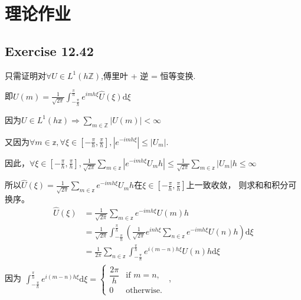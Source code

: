 \documentclass[UTF8]{ctexart}
\newcommand{\dif}{\mathrm{d}}
\begin{document}
\pagestyle{fancy}
\fancyhead{}
\rhead{\today}



\section*{理论作业}
\subsection*{Exercise 12.42}
只需证明对$\forall U \in L^1(h\mathbb{Z} )$,傅里叶 + 逆 = 恒等变换.

即$U(m) = \frac{1}{\sqrt{2\pi}} \int_{-\frac{\pi}{h}}^{\frac{\pi}{h}} e^{imh\xi}\hat{U}(\xi) \dif\xi$

因为$U\in L^1(h\mathbb{z}) \Rightarrow \sum_{m\in\mathbb{Z}} |U(m)| < \infty$

又因为$\forall m\in \mathbb{z}, \forall \xi \in[-\frac{\pi}{h}, \frac{\pi}{h}], |e^{-imh\xi}|\leq |U_m|$.

因此，$\forall \xi\in [-\frac{\pi}{h}, \frac{\pi}{h}], \frac{1}{\sqrt{2\pi}}\sum_{m\in\mathbb{z}}|e^{-imh\xi}U_mh| \leq \frac{1}{\sqrt{2\pi}}\sum_{m\in\mathbb{z}}|U_m|h \leq \infty$

所以$\hat{U}(\xi) = \frac{1}{\sqrt{2\pi}}\sum_{m\in\mathbb{z}} e^{-imh\xi}U_mh$在$\xi \in [-\frac{\pi}{h}, \frac{\pi}{h}]$上一致收敛，
则求和和积分可换序。
\begin{equation}
    \label{eq:12.42}
    \begin{aligned}
        \hat{U}(\xi) &= \frac{1}{\sqrt{2\pi}}\sum_{m\in\mathbb{z}} e^{-imh\xi}U(m)h \\
                     &= \frac{1}{\sqrt{2\pi}}\int_{-\frac{\pi}{h}}^{\frac{\pi}{h}} (\frac{1}{\sqrt{2\pi}}e^{inh\xi}\sum_{n\in\mathbb{z}} e^{-imh\xi}U(n)h )\dif\xi \\
                     &= \frac{1}{2\pi}\sum_{n\in \mathbb{z}}\int_{-\frac{\pi}{h}}^{\frac{\pi}{h}} e^{i(m-n)h\xi}U(n)h \dif\xi 
    \end{aligned}    
\end{equation}
因为$\begin{aligned}
    \int_{-\frac{\pi}{h}}^{\frac{\pi}{h}} e^{i(m-n)h\xi} \dif\xi = 
        \begin{cases}
            \dfrac{2\pi}{h} & \text{if } m = n, \\
            0 & \text{otherwise.}
        \end{cases}
\end{aligned}$,
\end{document}

